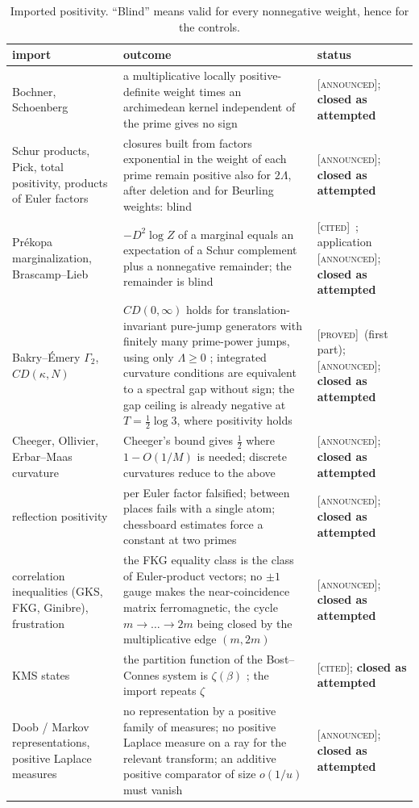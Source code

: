 \documentclass[11pt]{amsart}
\theoremstyle{definition}
\theoremstyle{remark}
\numberwithin{equation}{section}
\newcommand{\stag}[1]{\textsc{[#1]}}
\newcommand{\PROVED}{\stag{proved}}
\newcommand{\CITED}{\stag{cited}}
\newcommand{\ANNOUNCED}{\stag{announced}}
\newcommand{\rtag}[1]{\textbf{\small\textsf{#1}}}
\newcommand{\closedA}{\rtag{closed as attempted}}
\begin{document}
\begin{table}[htbp]\centering\small
\caption{Imported positivity. ``Blind'' means valid for every nonnegative weight, hence for the controls.}\label{w4:tab:import}
\begin{tabular}{@{}p{3.6cm}p{7.4cm}p{2.8cm}@{}}
\toprule
import & outcome & status\\
\midrule
Bochner, Schoenberg & a multiplicative locally positive-definite weight times an archimedean kernel independent of the prime gives no sign & \ANNOUNCED; \closedA\\
Schur products, Pick, total positivity, products of Euler factors & closures built from factors exponential in the weight of each prime remain positive also for $2\Lambda$, after deletion and for Beurling weights: blind & \ANNOUNCED; \closedA\\
Pr\'ekopa marginalization, Brascamp--Lieb & $-D^2\log Z$ of a marginal equals an expectation of a Schur complement plus a nonnegative remainder; the remainder is blind & \CITED\ \cite{BrascampLieb1976}; application \ANNOUNCED; \closedA\\
Bakry--\'Emery $\Gamma_2$, $CD(\kappa,N)$ & $CD(0,\infty)$ holds for translation-invariant pure-jump generators with finitely many prime-power jumps, using only $\Lambda\ge0$ \cite[Theorems~5.2--5.3]{P35}; integrated curvature conditions are equivalent to a spectral gap without sign; the gap ceiling is already negative at $T=\frac12\log3$, where positivity holds & \PROVED\ (first part); \ANNOUNCED; \closedA\\
Cheeger, Ollivier, Erbar--Maas curvature & Cheeger's bound gives $\frac12$ where $1-O(1/M)$ is needed; discrete curvatures reduce to the above & \ANNOUNCED; \closedA\\
reflection positivity & per Euler factor falsified; between places fails with a single atom; chessboard estimates force a constant at two primes & \ANNOUNCED; \closedA\\
correlation inequalities (GKS, FKG, Ginibre), frustration & the FKG equality class is the class of Euler-product vectors; no $\pm1$ gauge makes the near-coincidence matrix ferromagnetic, the cycle $m\to\dots\to2m$ being closed by the multiplicative edge $(m,2m)$ & \ANNOUNCED; \closedA\\
KMS states & the partition function of the Bost--Connes system is $\zeta(\beta)$ \cite{BostConnes1995}; the import repeats $\zeta$ & \CITED; \closedA\\
Doob / Markov representations, positive Laplace measures & no representation by a positive family of measures; no positive Laplace measure on a ray for the relevant transform; an additive positive comparator of size $o(1/u)$ must vanish & \ANNOUNCED; \closedA\\

\end{tabular}
\end{table}
\end{document}
